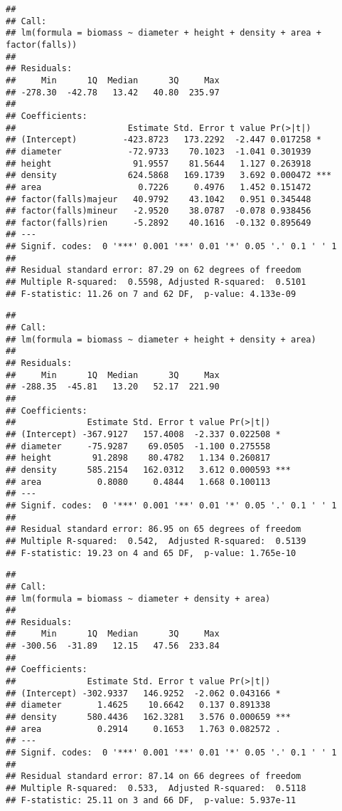 \documentclass[]{article}
\begin{document}
\begin{verbatim}
## 
## Call:
## lm(formula = biomass ~ diameter + height + density + area + factor(falls))
## 
## Residuals:
##     Min      1Q  Median      3Q     Max 
## -278.30  -42.78   13.42   40.80  235.97 
## 
## Coefficients:
##                      Estimate Std. Error t value Pr(>|t|)    
## (Intercept)         -423.8723   173.2292  -2.447 0.017258 *  
## diameter             -72.9733    70.1023  -1.041 0.301939    
## height                91.9557    81.5644   1.127 0.263918    
## density              624.5868   169.1739   3.692 0.000472 ***
## area                   0.7226     0.4976   1.452 0.151472    
## factor(falls)majeur   40.9792    43.1042   0.951 0.345448    
## factor(falls)mineur   -2.9520    38.0787  -0.078 0.938456    
## factor(falls)rien     -5.2892    40.1616  -0.132 0.895649    
## ---
## Signif. codes:  0 '***' 0.001 '**' 0.01 '*' 0.05 '.' 0.1 ' ' 1
## 
## Residual standard error: 87.29 on 62 degrees of freedom
## Multiple R-squared:  0.5598, Adjusted R-squared:  0.5101 
## F-statistic: 11.26 on 7 and 62 DF,  p-value: 4.133e-09
\end{verbatim}

\begin{verbatim}
## 
## Call:
## lm(formula = biomass ~ diameter + height + density + area)
## 
## Residuals:
##     Min      1Q  Median      3Q     Max 
## -288.35  -45.81   13.20   52.17  221.90 
## 
## Coefficients:
##              Estimate Std. Error t value Pr(>|t|)    
## (Intercept) -367.9127   157.4008  -2.337 0.022508 *  
## diameter     -75.9287    69.0505  -1.100 0.275558    
## height        91.2898    80.4782   1.134 0.260817    
## density      585.2154   162.0312   3.612 0.000593 ***
## area           0.8080     0.4844   1.668 0.100113    
## ---
## Signif. codes:  0 '***' 0.001 '**' 0.01 '*' 0.05 '.' 0.1 ' ' 1
## 
## Residual standard error: 86.95 on 65 degrees of freedom
## Multiple R-squared:  0.542,  Adjusted R-squared:  0.5139 
## F-statistic: 19.23 on 4 and 65 DF,  p-value: 1.765e-10
\end{verbatim}

\begin{verbatim}
## 
## Call:
## lm(formula = biomass ~ diameter + density + area)
## 
## Residuals:
##     Min      1Q  Median      3Q     Max 
## -300.56  -31.89   12.15   47.56  233.84 
## 
## Coefficients:
##              Estimate Std. Error t value Pr(>|t|)    
## (Intercept) -302.9337   146.9252  -2.062 0.043166 *  
## diameter       1.4625    10.6642   0.137 0.891338    
## density      580.4436   162.3281   3.576 0.000659 ***
## area           0.2914     0.1653   1.763 0.082572 .  
## ---
## Signif. codes:  0 '***' 0.001 '**' 0.01 '*' 0.05 '.' 0.1 ' ' 1
## 
## Residual standard error: 87.14 on 66 degrees of freedom
## Multiple R-squared:  0.533,  Adjusted R-squared:  0.5118 
## F-statistic: 25.11 on 3 and 66 DF,  p-value: 5.937e-11
\end{verbatim}
\end{document}
